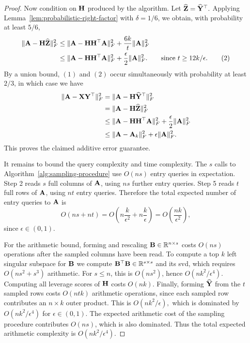 \begin{proof}
Now condition on \(\mathbf{H}\) produced by the algorithm. Let
\(
    \widehat{\mathbf{Z}}=\widehat{\mathbf{Y}}^{\top}.
\)
Applying Lemma~\ref{lem:probabilistic-right-factor} with
\(\delta=1/6\), we obtain, with probability at least \(5/6\),
\begin{align*}
    \|\mathbf{A}-\mathbf{H}\widehat{\mathbf{Z}}\|_F^2
    &\leq
    \|\mathbf{A}-\mathbf{H}\mathbf{H}^\top\mathbf{A}\|_F^2
    +
    \frac{6k}{t}\|\mathbf{A}\|_F^2\\
    &\leq\|\mathbf{A}-\mathbf{H}\mathbf{H}^\top\mathbf{A}\|_F^2
    +
    \frac{\epsilon}{2}\|\mathbf{A}\|_F^2.
    \qquad\text{since \(t\geq 12k/\epsilon\)}. \tag{2}
\end{align*}
By a union bound, \((1)\) and \((2)\) occur simultaneously with
probability at least \(2/3\), in which case we have
\[
\begin{aligned}
    \|\mathbf{A}-\mathbf{X}\mathbf{Y}^\top\|_F^2
    &=
    \|\mathbf{A}-\mathbf{H}\widehat{\mathbf{Y}}^{\top}\|_F^2  \\
    &=
    \|\mathbf{A}-\mathbf{H}\widehat{\mathbf{Z}}\|_F^2 \\
    &\leq
    \|\mathbf{A}-\mathbf{H}\mathbf{H}^\top\mathbf{A}\|_F^2
    +
    \frac{\epsilon}{2}\|\mathbf{A}\|_F^2 \\
    &\leq
    \|\mathbf{A}-\mathbf{A}_k\|_F^2
    +
    \epsilon\|\mathbf{A}\|_F^2.
\end{aligned}
\]
This proves the claimed additive error guarantee.

It remains to bound the query complexity and time complexity. The \(s\) calls to
Algorithm~\ref{alg:sampling-procedure} use \(O(ns)\) entry queries in
expectation. Step 2 reads \(s\) full columns of \(\mathbf{A}\), using \(ns\) further
entry queries. Step 5 reads \(t\) full rows of \(\mathbf{A}\), using \(nt\) entry
queries. Therefore the total expected number of entry queries to $\mathbf{A}$ is
\[
    O(ns+nt)
    =
    O\!\left(
        n\frac{k}{\epsilon^2}
        +
        n\frac{k}{\epsilon}
    \right)
    =
    O\!\left(\frac{nk}{\epsilon^2}\right),
\]
since \(\epsilon\in(0,1)\).

For the arithmetic bound, forming and rescaling \(\mathbf{B}\in\mathbb{R}^{n\times s}\) costs \(O(ns)\)
operations after the sampled columns have been read. To compute a top \(k\)
left singular subspace for \(\mathbf{B}\) we compute \(\mathbf{B}^\top\mathbf{B}\in\mathbb{R}^{s\times s}\) and its svd, which requires
\(
    O(ns^2+s^3)
\)
arithmetic. For \(s\leq n\), this is \(O(ns^2)\), hence
\(
    O\left({nk^2}/{\epsilon^4}\right).
\)
Computing all leverage scores of \(\mathbf{H}\) costs \(O(nk)\). Finally, forming \(\widehat{\mathbf{Y}}\) from the \(t\) sampled rows costs
\(O(ntk)\) arithmetic operations, since each sampled row contributes an
\(n\times k\) outer product. This is 
\(
    O\left({nk^2}/{\epsilon}\right),
\)
which is dominated by \(O(nk^2/\epsilon^4)\) for \(\epsilon\in(0,1)\). The
expected arithmetic cost of the sampling procedure contributes \(O(ns)\), which
is also dominated. Thus the total expected arithmetic complexity is
\(
    O\!\left({nk^2}/{\epsilon^4}\right).
\)
\end{proof}
